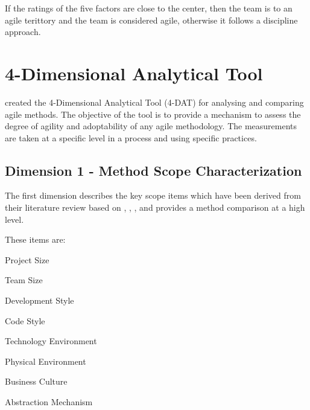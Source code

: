 

If the ratings of the five factors are close to the center, then the team is to an agile terittory and the team  is considered agile, otherwise it follows a discipline approach.





\section{4-Dimensional Analytical Tool}
\citet{qumer2006measuring} created the 4-Dimensional Analytical Tool (4-DAT) for analysing and comparing agile methods. The objective of the tool is to provide a mechanism to assess the degree of agility and adoptability of any agile methodology. The measurements are taken at a specific level in a process and using specific practices.

\subsection{Dimension 1 - Method Scope Characterization}
The first dimension describes the key scope items which have been derived from their literature review based on \citet{Beck:2004:EPE:1076267}, \citet{koch2005agile}, \citet{Palmer:2001:PGF:600044}, \citet{Highsmith:2000:ASD:323922} and provides a method comparison at a high level. 

These items are:
\begin{inparaenum} [a\upshape)]
\item Project Size
\item Team Size
\item Development Style
\item Code Style
\item Technology Environment
\item Physical Environment
\item Business Culture
\item Abstraction Mechanism
\end{inparaenum}

